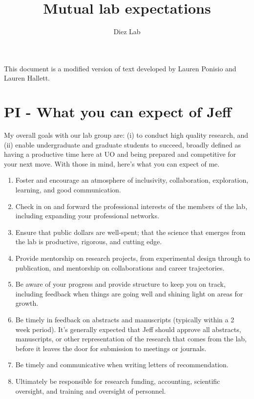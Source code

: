 \documentclass[12pt]{article}
\title{Mutual lab expectations}
\subtitle{ }
\author{Diez Lab}
\begin{document}
\maketitle

This document is a modified version of text developed by Lauren Ponisio and Lauren Hallett.


\section{PI - What you can expect of Jeff}
My overall goals with our lab group are: (i) to conduct high quality research, and (ii) enable undergraduate and graduate students to succeed, broadly defined as having a productive time here at UO and being prepared and competitive for your next move.  With those in mind, here's what you can expect of me.

\begin{enumerate}
\item Foster and encourage an atmosphere of inclusivity, collaboration, exploration, learning, and good communication.
\item Check in on and forward the professional interests of the members of the lab, including expanding your professional networks.
\item Ensure that public dollars are well-spent; that the science that emerges from the lab is productive, rigorous, and cutting edge.

\item Provide mentorship on research projects, from experimental design through to publication, and mentorship on collaborations and career trajectories.
\item Be aware of your progress and provide structure to keep you on track, including feedback when things are going well and shining light on areas for growth.
\item Be timely in feedback on abstracts and manuscripts (typically within a 2 week period).
It's generally expected that Jeff should approve all abstracts, manuscripts, or other representation of the research that comes from the lab, before it leaves the door for submission to meetings or journals.
\item Be timely and communicative when writing letters of recommendation.
\item Ultimately be responsible for research funding, accounting,  scientific oversight, and training and oversight of personnel.
\end{enumerate}
\end{document}
